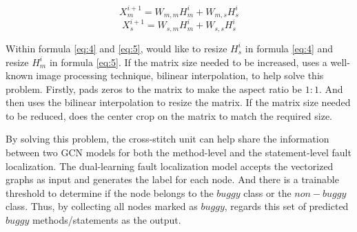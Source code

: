 \begin{equation}\label{eq:4}
	X_m^{i+1} = W_{m,m}H_m^{i} + W_{m,s}H_s^{i}
\end{equation}
\begin{equation}\label{eq:5}
	X_s^{i+1} = W_{s,m}H_m^{i} + W_{s,s}H_s^{i}
\end{equation}

Within formula \ref{eq:4} and \ref{eq:5}, \tool would like to resize $H_s^{i}$ in formula \ref{eq:4} and resize $H_m^{i}$ in formula \ref{eq:5}. If the matrix size needed to be increased, \tool uses a well-known image processing technique, bilinear interpolation, to help solve this problem. Firstly, \tool pads zeros to the matrix to make the aspect ratio be $1:1$. And then \tool uses the bilinear interpolation to resize the matrix. If the matrix size needed to be reduced, \tool does the center crop on the matrix to match the required size.

By solving this problem, the cross-stitch unit can help share the information between two GCN models for both the method-level and the statement-level fault localization. The dual-learning fault localization model accepts the vectorized graphs as input and generates the label for each node. And there is a trainable threshold to determine if the node belongs to the $buggy$ class or the $non-buggy$ class. Thus, by collecting all nodes marked as $buggy$, \tool regards this set of predicted $buggy$ methods/statements as the output. 

